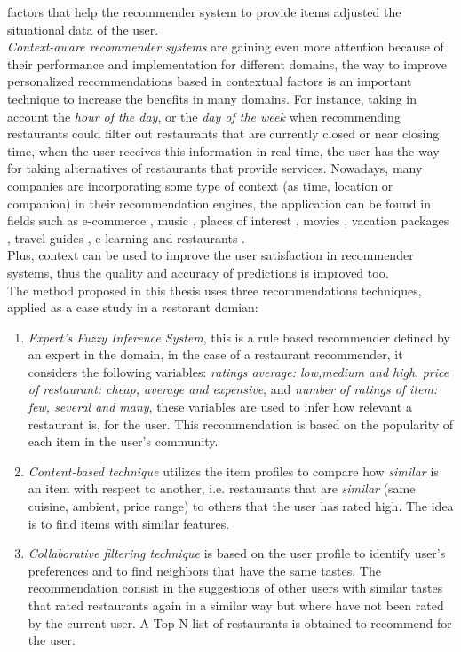 factors that help the recommender system to provide items adjusted the
situational data of the user.\\
\textit{Context-aware recommender systems} are gaining even more
attention because of their performance and implementation for
different domains, the  way to improve personalized recommendations
based in contextual factors is an important technique to increase the
benefits in  many domains. For instance, taking in account the
\textit{hour of the day},  or the \textit{day of the week} when
recommending restaurants could  filter out restaurants that are
currently closed or near closing time, when the user receives this
information in real time, the user has the  way for taking
alternatives of restaurants that provide services. Nowadays, many
companies are incorporating some type of context (as time, location or
companion) in their recommendation engines, the application can be
found in fields such as e-commerce \cite{schafer1999recommender}
 \cite{bulander2005enabling}, music \cite{ricci2012context}
 \cite{baltrunas2011incarmusic}  \cite{huq2010automated}, places of
interest \cite{baltrunas2012context},
movies \cite{eyjolfsdottir2010moviegen}, vacation
packages \cite{liu2011personalized}  \cite{liu2014cocktail},  travel
guides \cite{savage2012m}, e-learning \cite{ortigosa2010entornos}  and
restaurants \cite{chu2013chinese}.\\
Plus, context can be used to improve the user satisfaction  in
recommender systems, thus the quality and accuracy of predictions  
is improved too. \\
The method proposed in this thesis uses three recommendations techniques,
applied as a case study in a restarant domian:
\begin{enumerate} 
\item \textit{Expert's Fuzzy Inference System}, this is a rule based 
recommender defined by an expert in the domain, in the case of 
a restaurant recommender, it considers the following
variables: \textit{ratings average: low,medium and high},
\textit{price of restaurant: cheap, average and expensive}, and
\textit{number of ratings of item: few, several and many}, these
variables are used to infer how relevant a restaurant is, for the user.
This recommendation is based on the popularity of each item in the
user's community.
\item \textit{Content-based technique} utilizes the item profiles 
to compare how \textit{similar} is an item with respect to 
another, i.e. restaurants that are \textit{similar} (same cuisine, 
ambient, price range) to others that the user has rated high. 
The idea is to find items with similar features. 
\item \textit{Collaborative filtering technique} is based on the user
profile to identify user's preferences and to find neighbors that
have the same tastes. The recommendation consist in the suggestions of
other users with similar tastes that rated restaurants again in a
similar way but where have not been rated by the current user. A Top-N
list of restaurants is obtained to recommend for the user.
\end{enumerate} 
